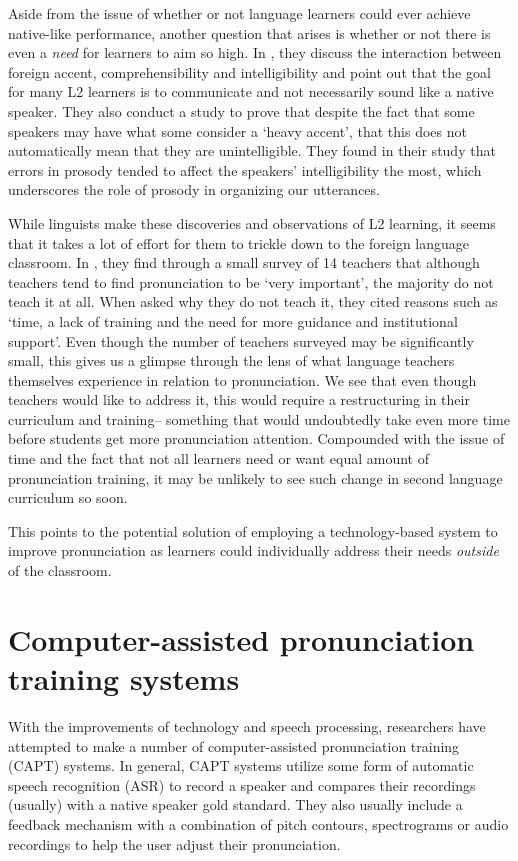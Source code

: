 \documentclass
[
    a4paper,
    twoside,
    12pt
]
{report}
\begin{document}
Aside from the issue of whether or not language learners could ever
achieve native-like performance, another question that arises is whether
or not there is even a \textit{need} for learners to aim so high. In
\textcite{munro1999}, they discuss the interaction between foreign
accent, comprehensibility and intelligibility and point out that the
goal for many L2 learners is to communicate and not necessarily sound
like a native speaker. They also conduct a study to prove that despite
the fact that some speakers may have what some consider a `heavy
accent', that this does not automatically mean that they are
unintelligible. They found in their study that errors in prosody tended
to affect the speakers' intelligibility the most, which underscores the
role of prosody in organizing our utterances.

While linguists make these discoveries and observations of L2 learning,
it seems that it takes a lot of effort for them to trickle down to the
foreign language classroom. In \textcite{darcy2012}, they find through a
small survey of 14 teachers that although teachers tend to find
pronunciation to be `very important', the majority do not teach it at
all. When asked why they do not teach it, they cited reasons such as
`time, a lack of training and the need for more guidance and
institutional support'. Even though the number of teachers surveyed may
be significantly small, this gives us a glimpse through the lens of what
language teachers themselves experience in relation to pronunciation. We
see that even though teachers would like to address it, this would
require a restructuring in their curriculum and training-- something
that would undoubtedly take even more time before students get more
pronunciation attention. Compounded with the issue of time and the fact
that not all learners need or want equal amount of pronunciation
training, it may be unlikely to see such change in second language
curriculum so soon.

This points to the potential solution of employing a technology-based
system to improve pronunciation as learners could individually address
their needs \textit{outside} of the classroom.

\section{Computer-assisted pronunciation training
systems}\label{computer-assisted-pronunciation-training-systems}

\label{sec:capt} With the improvements of technology and speech
processing, researchers have attempted to make a number of
computer-assisted pronunciation training (CAPT) systems. In general,
CAPT systems utilize some form of automatic speech recognition (ASR) to
record a speaker and compares their recordings (usually) with a native
speaker gold standard. They also usually include a feedback mechanism
with a combination of pitch contours, spectrograms or audio recordings
to help the user adjust their pronunciation.
\end{document}
